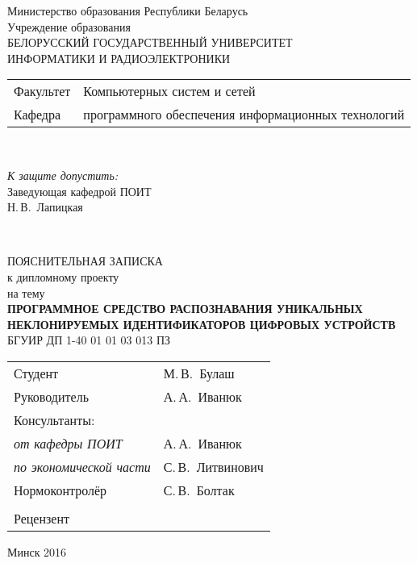 \begin{titlepage}
  \begin{center}
    Министерство образования Республики Беларусь\\[1em]
    Учреждение образования\\
    БЕЛОРУССКИЙ ГОСУДАРСТВЕННЫЙ УНИВЕРСИТЕТ \\
    ИНФОРМАТИКИ И РАДИОЭЛЕКТРОНИКИ\\[1em]

    \begin{minipage}{\textwidth}
      \begin{flushleft}
        \begin{tabular}{ l l }
          Факультет & Компьютерных систем и сетей\\
          Кафедра   & программного обеспечения информационных технологий
        \end{tabular}
      \end{flushleft}
    \end{minipage}\\[1em]

    \begin{flushright}
      \begin{minipage}{0.4\textwidth}
        \textit{К защите допустить:}\\[0.8em]
        Заведующая кафедрой ПОИТ\\[0.45em]
        \underline{\hspace*{2.8cm}} Н.\,В.~Лапицкая
      \end{minipage}\\[2.2em]
    \end{flushright}

    {ПОЯСНИТЕЛЬНАЯ ЗАПИСКА}\\
    {к дипломному проекту}\\
    {на тему}\\[1em]
    \textbf{\large ПРОГРАММНОЕ СРЕДСТВО РАСПОЗНАВАНИЯ УНИКАЛЬНЫХ НЕКЛОНИРУЕМЫХ ИДЕНТИФИКАТОРОВ ЦИФРОВЫХ УСТРОЙСТВ}\\[1em]


    {БГУИР ДП 1-40 01 01 03 013 ПЗ}\\[2em]

    \begin{tabular}{ p{}p{} }
      Студент & М.\,В.~Булаш \\
      Руководитель & А.\,А.~Иванюк \\
      Консультанты: &\\
      \hspace*{3ex}\emph{от кафедры ПОИТ} & А.\,А.~Иванюк \\
      \hspace*{3ex}\emph{по экономической части} & С.\,В.~Литвинович \\
      Нормоконтролёр & С.\,В.~Болтак\\
      & \\
      Рецензент &
    \end{tabular}

    \vfill
    {\normalsize Минск 2016}
  \end{center}
\end{titlepage}
